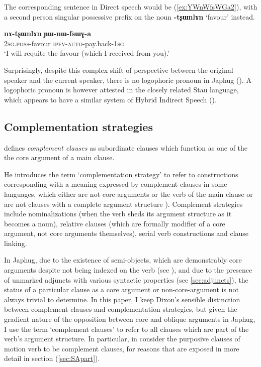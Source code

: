 \documentclass[oneside,a4paper,11pt]{article}
\newcommand{\ipa}[1]{\textbf{\phon#1}} %
\newcommand{\jpg}[2]{\ipa{#1} `#2'} %
\newcommand{\refb}[1]{(\ref{#1})}
\begin{document}
The corresponding sentence in Direct speech would be \refb{ex:YWnWfsWGa2}, with a second person singular possessive prefix on the noun  \jpg{-tʂɯnlɤn}{favour} instead.

\begin{exe}
\ex \label{ex:YWnWfsWGa2}
 \gll  \ipa{nɤ-tʂɯnlɤn}  	\ipa{ɲɯ-nɯ-fsɯɣ-a} \\
  {\textsc{2sg.poss}-favour} {\textsc{ipfv-auto}-pay.back-\textsc{1sg}} \\ 
 \glt `I will requite the favour (which I received from you).'
\end{exe}


Surprisingly, despite this complex shift of perspective between the original speaker and the current speaker, there is no logophoric pronoun in Japhug (\citealt{hagege74logophoriques, nikitina12logophoric}). A logophoric pronoun is however attested in the closely related Stau language, which appears to have a similar system of Hybrid Indirect Speech (\citealt{jacques16stau}).

 \subsection{Complementation strategies}  
  \label{sec:strategies}

\citet[15]{dixon06complementation} defines \textit{complement clauses} as subordinate clauses which function as one of the the core argument of a main clause. 

He introduces the term `complementation strategy' to refer to constructions corresponding with a meaning expressed by complement clauses in some languages, which either are not core arguments or the verb of the main clause or are not clauses with a complete argument structure \citealt[34-40]{dixon06complementation}). Complement strategies include nominalizations (when the verb sheds its argument structure as it becomes a noun), relative clauses (which are formally modifier of a core argument, not core arguments themselves), serial verb constructions and clause linking.

In Japhug, due to the existence of semi-objects, which are demonstrably core arguments despite not being indexed on the verb (see \citet{jacques16relatives}), and due to the presence of unmarked adjuncts with various syntactic properties (see \ref{sec:adjuncts}), the status of a particular clause as a core argument or non-core-argument is not always trivial to determine. In this paper, I keep Dixon's sensible distinction between complement clauses and complementation strategies, but given the gradient nature of the opposition between core and oblique arguments in Japhug, I use the term `complement clauses' to refer to all clauses which are part of the verb's argument structure. In particular, in consider the purposive clauses of motion verb to be complement clauses, for reasons that are exposed in more detail in section (\ref{sec:SApart}).
 
\end{document}
